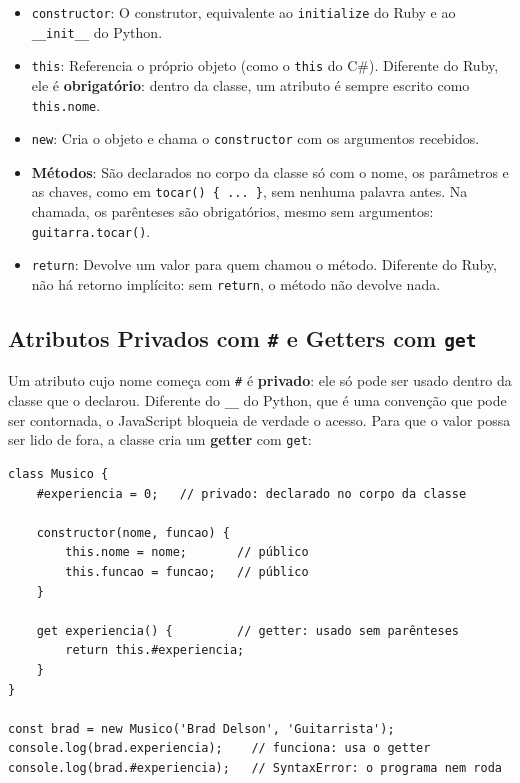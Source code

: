 \begin{itemize}
    \item \texttt{constructor}: O construtor, equivalente ao \texttt{initialize} do Ruby e ao
    \texttt{\_\_init\_\_} do Python.

    \item \texttt{this}: Referencia o próprio objeto (como o \texttt{this} do C\#). Diferente do
    Ruby, ele é \textbf{obrigatório}: dentro da classe, um atributo é sempre escrito como
    \texttt{this.nome}.

    \item \texttt{new}: Cria o objeto e chama o \texttt{constructor} com os argumentos
    recebidos.

    \item \textbf{Métodos}: São declarados no corpo da classe só com o nome, os parâmetros e as
    chaves, como em \texttt{tocar() \{ ... \}}, sem nenhuma palavra antes. Na chamada, os
    parênteses são obrigatórios, mesmo sem argumentos: \texttt{guitarra.tocar()}.

    \item \texttt{return}: Devolve um valor para quem chamou o método. Diferente do Ruby, não há
    retorno implícito: sem \texttt{return}, o método não devolve nada.
\end{itemize}

\subsection{Atributos Privados com \texttt{\#} e Getters com \texttt{get}}

Um atributo cujo nome começa com \texttt{\#} é \textbf{privado}: ele só pode ser usado dentro da
classe que o declarou. Diferente do \texttt{\_\_} do Python, que é uma convenção que pode ser
contornada, o JavaScript bloqueia de verdade o acesso. Para que o valor possa ser lido de fora,
a classe cria um \textbf{getter} com \texttt{get}:

\begin{lstlisting}[style=javascript]
class Musico {
    #experiencia = 0;   // privado: declarado no corpo da classe

    constructor(nome, funcao) {
        this.nome = nome;       // público
        this.funcao = funcao;   // público
    }

    get experiencia() {         // getter: usado sem parênteses
        return this.#experiencia;
    }
}

const brad = new Musico('Brad Delson', 'Guitarrista');
console.log(brad.experiencia);    // funciona: usa o getter
console.log(brad.#experiencia);   // SyntaxError: o programa nem roda
\end{lstlisting}

